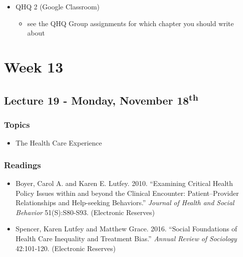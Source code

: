 \documentclass[]{book}
\providecommand{\tightlist}{%
  \setlength{\itemsep}{0pt}\setlength{\parskip}{0pt}}
\begin{document}
\begin{itemize}
\tightlist
\item
  QHQ 2 (Google Classroom)

  \begin{itemize}
  \tightlist
  \item
    see the QHQ Group assignments for which chapter you should write about
  \end{itemize}
\end{itemize}

\newpage

\hypertarget{week-13}{%
\section*{Week 13}\label{week-13}}

\hypertarget{lecture-19---monday-november-18th}{%
\subsection*{\texorpdfstring{Lecture 19 - Monday, November 18\textsuperscript{th}}{Lecture 19 - Monday, November 18th}}\label{lecture-19---monday-november-18th}}

\hypertarget{topics-24}{%
\subsubsection*{Topics}\label{topics-24}}

\begin{itemize}
\tightlist
\item
  The Health Care Experience
\end{itemize}

\hypertarget{readings-22}{%
\subsubsection*{Readings}\label{readings-22}}

\begin{itemize}
\tightlist
\item
  Boyer, Carol A. and Karen E. Lutfey. 2010. ``Examining Critical Health Policy Issues within and beyond the Clinical Encounter: Patient--Provider Relationships and Help-seeking Behaviors.'' \emph{Journal of Health and Social Behavior} 51(S):S80-S93. (Electronic Reserves)
\item
  Spencer, Karen Lutfey and Matthew Grace. 2016. ``Social Foundations of Health Care Inequality and Treatment Bias.'' \emph{Annual Review of Sociology} 42:101-120. (Electronic Reserves)
\end{itemize}
\end{document}
